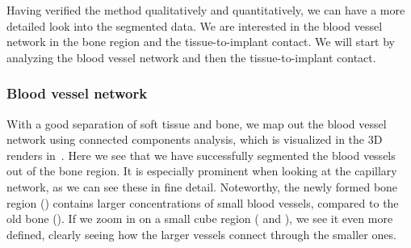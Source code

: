 Having verified the method qualitatively and quantitatively, we can have a more
detailed look into the segmented data. We are interested in the blood vessel
network in the bone region and the tissue-to-implant contact. We will start by
analyzing the blood vessel network and then the tissue-to-implant contact.

\subsubsection{Blood vessel network}
\label{sec:blood-network}

With a good separation of soft tissue and bone, we map out the blood vessel
network using connected components analysis, which is visualized in the 3D
renders in~. Here we see that we have successfully
segmented the blood vessels out of the bone region. It is especially prominent
when looking at the capillary network, as we can see these in fine detail.
Noteworthy, the newly formed bone region () contains
larger concentrations of small blood vessels, compared to the old bone
(). If we zoom in on a small cube region
( and ), we see it even more
defined, clearly seeing how the larger vessels connect through the smaller
ones.

